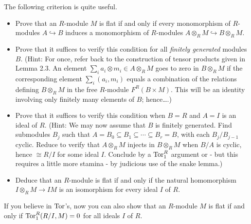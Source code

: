 \documentclass[../../master.tex]{subfiles}
\begin{document}
\begin{problem}
    The following criterion is quite useful.
    \begin{itemize}
        \item Prove that an $R$-module $M$ is flat if and only if every monomorphism of $R$-modules $A \hookrightarrow B$ induces a monomorphism of $R$-modules $A \otimes_R M \hookrightarrow B \otimes_R M$.
        \item Prove that it suffices to verify this condition for all \textit{finitely generated} modules $B$.
            (Hint: For once, refer back to the construction of tensor products given in Lemma 2.3.
            An element $\sum_i a_i \otimes m_i \in A \otimes_R M$ goes to zero in $B \otimes_R M$ if the corresponding element $\sum_i (a_i, m_i)$ equals a combination of the relations defining $B \otimes_R M$ in the free $R$-module $F^{R}(B \times M)$.
            This will be an identity involving only finitely many elements of $B$;
            hence\ldots.)
        \item Prove that it suffices to verify this condition when $B = R$ and $A = I$ is an ideal of $R$.
            (Hint: We may now assume that $B$ is finitely generated.
            Find submodules $B_j$ such that $A = B_0 \subseteq B_1 \subseteq \cdots \subseteq B_r = B$, with each $B_j / B_{j-1}$ cyclic.
            Reduce to verify that $A \otimes_R M$ injects in $B \otimes_R M$ when $B / A$ is cyclic, hence $\cong R/I$ for some ideal $I$.
            Conclude by a $\operatorname{Tor}_1^{R}$ argument or - but this requires a little more stamina - by judicious use of the snake lemma.)
        \item Deduce that an $R$-module is flat if and only if the natural homomorphism $I \otimes_R M \to IM$ is an isomorphism for every ideal $I$ of $R$.
    \end{itemize}
    If you believe in $\operatorname{Tor}$'s, now you can also show that an $R$-module $M$ is flat if and only if $\operatorname{Tor}_1^{R}(R/I, M) = 0$ for all ideals $I$ of $R$.
\end{problem}
\end{document}
